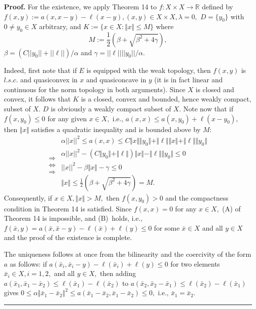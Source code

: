\documentclass{article}
\newenvironment{proof}[1][Proof]{\noindent\textbf{#1.} }{\ \rule{0.5em}{0.5em}}
\begin{document}
\begin{proof}
For the existence, we apply Theorem 14 to $f:X\times X\longrightarrow 
\mathbb{R}
$ defined by $f(x,y):=a(x,x-y)-\ell (x-y),(x,y)\in X\times X,\lambda =0,$ $%
D=\{y_{0}\}$ with $0\neq y_{0}\in X$ arbitrary, and $K:=\{x\in X:\Vert
x\Vert \leq M\}$ where 
\begin{equation*}
M:=\frac{1}{2}(\beta +\sqrt{\beta ^{2}+4\gamma }),
\end{equation*}%
$\beta =(C||y_{0}||+||\ell ||)/\alpha $ and $\gamma =||\ell
||||y_{0}||/\alpha .$

Indeed, first note that if $E$ is equipped with the weak topology, then $%
f(x,y)$ is $l.s.c.$ and quasiconvex in $x$ and quasiconcave in $y$ (it is in
fact linear and continuous for the norm topology in both arguments). Since $%
X $ is closed and convex, it follows that $K$ is a closed, convex and
bounded, hence weakly compact, subset of $X.$ $D$ is obviously a weakly
compact subset of $X.$ Note now that if $f(x,y_{0})\leq 0$ for any given $%
x\in X,$ i.e., $a(x,x)\leq a(x,y_{0})+\ell (x-y_{0}),$ then $\Vert x\Vert $
satisfies a quadratic inequality and is bounded above by $M$:%
\begin{equation*}
\left. 
\begin{array}{c}
\\ 
\Longrightarrow \\ 
\Longleftrightarrow \\ 
\Longrightarrow%
\end{array}%
\right. \left. 
\begin{array}{l}
\alpha ||x||^{2}\leq a(x,x)\leq C\Vert x\Vert \Vert y_{0}\Vert +\Vert \ell
\Vert \Vert x\Vert +\Vert \ell \Vert \Vert y_{0}\Vert \\ 
\alpha ||x||^{2}-(C\Vert y_{0}\Vert +\Vert \ell \Vert )\Vert x\Vert -\Vert
\ell \Vert \Vert y_{0}\Vert \leq 0 \\ 
||x||^{2}-\beta \Vert x\Vert -\gamma \leq 0 \\ 
\Vert x\Vert \leq \frac{1}{2}(\beta +\sqrt{\beta ^{2}+4\gamma })=M.%
\end{array}%
\right.
\end{equation*}%
Consequently, if $x\in X,\Vert x\Vert >M,$ then $f(x,y_{0})>0$ and the
compactness condition in Theorem 14 is satisfied. Since $f(x,x)=0$ for any $%
x\in X,$ (A) of Theorem 14 is impossible, and (B)\ holds, i.e., $f(\bar{x}%
,y)=a(\bar{x},\bar{x}-y)-\ell (\bar{x})+\ell (y)\leq 0$ for some $\bar{x}\in
X$ and all $y\in X$ and the proof of the existence is complete.

The uniqueness follows at once from the bilinearity and the coercivity of
the form $a$ as follows: if $a(\bar{x}_{i},\bar{x}_{i}-y)-\ell (\bar{x}%
_{i})+\ell (y)\leq 0$ for two elements $\bar{x}_{i}\in X,i=1,2,$ and all $%
y\in X,$ then adding $a(\bar{x}_{1},\bar{x}_{1}-\bar{x}_{2})\leq \ell (\bar{x%
}_{1})-\ell (\bar{x}_{2})$ to $a(\bar{x}_{2},\bar{x}_{2}-\bar{x}_{1})\leq
\ell (\bar{x}_{2})-\ell (\bar{x}_{1})$ gives $0\leq \alpha \Vert \bar{x}_{1}-%
\bar{x}_{2}\Vert ^{2}\leq a(\bar{x}_{1}-\bar{x}_{2},\bar{x}_{1}-\bar{x}%
_{2})\leq 0,$ i.e., $\bar{x}_{1}=\bar{x}_{2}.$
\end{proof}
\end{document}
